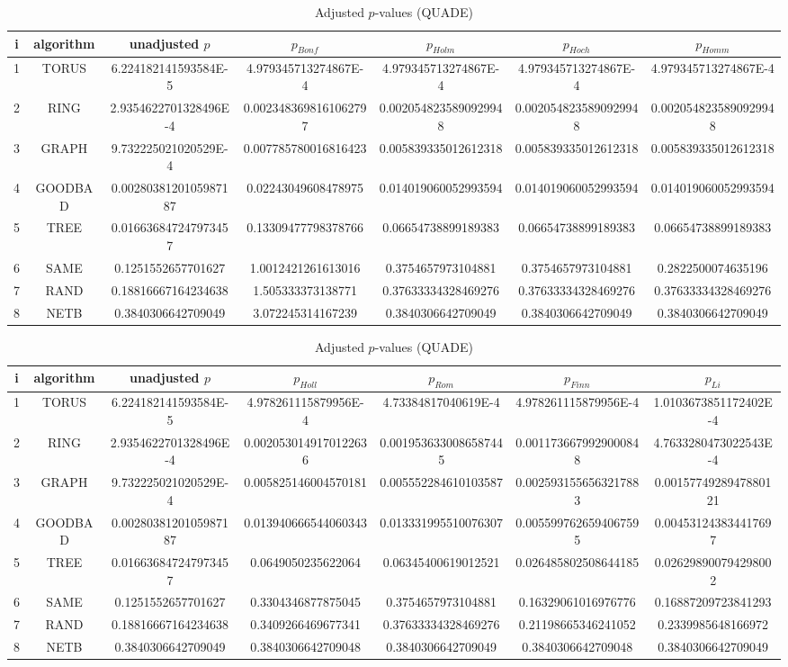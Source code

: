 \documentclass[a4paper,10pt]{article}
\begin{document}
\begin{landscape}
\begin{table}[!htp]
\centering\scriptsize
\caption{Adjusted $p$-values (QUADE)}
\begin{tabular}{ccccccc}
i&algorithm&unadjusted $p$&$p_{Bonf}$&$p_{Holm}$&$p_{Hoch}$&$p_{Homm}$\\
\hline
1& TORUS&6.224182141593584E-5&4.979345713274867E-4&4.979345713274867E-4&4.979345713274867E-4&4.979345713274867E-4\\
2& RING&2.9354622701328496E-4&0.0023483698161062797&0.0020548235890929948&0.0020548235890929948&0.0020548235890929948\\
3& GRAPH&9.732225021020529E-4&0.007785780016816423&0.005839335012612318&0.005839335012612318&0.005839335012612318\\
4& GOODBAD&0.0028038120105987187&0.02243049608478975&0.014019060052993594&0.014019060052993594&0.014019060052993594\\
5& TREE&0.016636847247973457&0.13309477798378766&0.06654738899189383&0.06654738899189383&0.06654738899189383\\
6& SAME&0.1251552657701627&1.0012421261613016&0.3754657973104881&0.3754657973104881&0.2822500074635196\\
7& RAND&0.18816667164234638&1.505333373138771&0.37633334328469276&0.37633334328469276&0.37633334328469276\\
8& NETB&0.3840306642709049&3.072245314167239&0.3840306642709049&0.3840306642709049&0.3840306642709049\\
\hline
\end{tabular}
\end{table}

\begin{table}[!htp]
\centering\scriptsize
\caption{Adjusted $p$-values (QUADE)}
\begin{tabular}{ccccccc}
i&algorithm&unadjusted $p$&$p_{Holl}$&$p_{Rom}$&$p_{Finn}$&$p_{Li}$\\
\hline
1& TORUS&6.224182141593584E-5&4.978261115879956E-4&4.73384817040619E-4&4.978261115879956E-4&1.0103673851172402E-4\\
2& RING&2.9354622701328496E-4&0.0020530149170122636&0.0019536330086587445&0.0011736679929000848&4.7633280473022543E-4\\
3& GRAPH&9.732225021020529E-4&0.005825146004570181&0.005552284610103587&0.0025931556563217883&0.0015774928947880121\\
4& GOODBAD&0.0028038120105987187&0.013940666544060343&0.013331995510076307&0.0055997626594067595&0.004531243834417697\\
5& TREE&0.016636847247973457&0.0649050235622064&0.06345400619012521&0.026485802508644185&0.026298900794298002\\
6& SAME&0.1251552657701627&0.3304346877875045&0.3754657973104881&0.16329061016976776&0.16887209723841293\\
7& RAND&0.18816667164234638&0.3409266469677341&0.37633334328469276&0.21198665346241052&0.2339985648166972\\
8& NETB&0.3840306642709049&0.3840306642709048&0.3840306642709049&0.3840306642709048&0.3840306642709049\\
\hline
\end{tabular}
\end{table}

\end{landscape}
\end{document}
